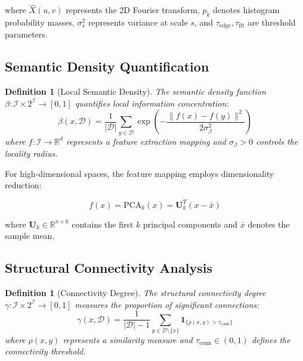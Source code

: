 \documentclass[11pt,a4paper]{article}
\newtheorem{definition}[theorem]{Definition}
\begin{document}
where $\hat{X}(u,v)$ represents the 2D Fourier transform, $p_k$ denotes histogram probability masses, $\sigma_s^2$ represents variance at scale $s$, and $\tau_{\text{edge}}, \tau_{\text{fft}}$ are threshold parameters.

\subsection{Semantic Density Quantification}

\begin{definition}[Local Semantic Density]
The semantic density function $\beta: \mathcal{I} \times 2^{\mathcal{I}} \to [0,1]$ quantifies local information concentration:
\begin{equation}
\beta(x, \mathcal{D}) = \frac{1}{|\mathcal{D}|} \sum_{y \in \mathcal{D}} \exp\left(-\frac{\|f(x) - f(y)\|^2}{2\sigma_{\beta}^2}\right)
\label{eq:semantic-density}
\end{equation}
where $f: \mathcal{I} \to \mathbb{R}^d$ represents a feature extraction mapping and $\sigma_{\beta} > 0$ controls the locality radius.
\end{definition}

For high-dimensional spaces, the feature mapping employs dimensionality reduction:

\begin{equation}
f(x) = \text{PCA}_k(x) = \mathbf{U}_k^T (x - \bar{x})
\label{eq:feature-mapping}
\end{equation}

where $\mathbf{U}_k \in \mathbb{R}^{n \times k}$ contains the first $k$ principal components and $\bar{x}$ denotes the sample mean.

\subsection{Structural Connectivity Analysis}

\begin{definition}[Connectivity Degree]
The structural connectivity degree $\gamma: \mathcal{I} \times 2^{\mathcal{I}} \to [0,1]$ measures the proportion of significant connections:
\begin{equation}
\gamma(x, \mathcal{D}) = \frac{1}{|\mathcal{D}| - 1} \sum_{y \in \mathcal{D} \setminus \{x\}} \mathbf{1}_{\{\rho(x,y) > \tau_{\text{conn}}\}}
\label{eq:connectivity-degree}
\end{equation}
where $\rho(x,y)$ represents a similarity measure and $\tau_{\text{conn}} \in (0,1)$ defines the connectivity threshold.
\end{definition}
\end{document}
